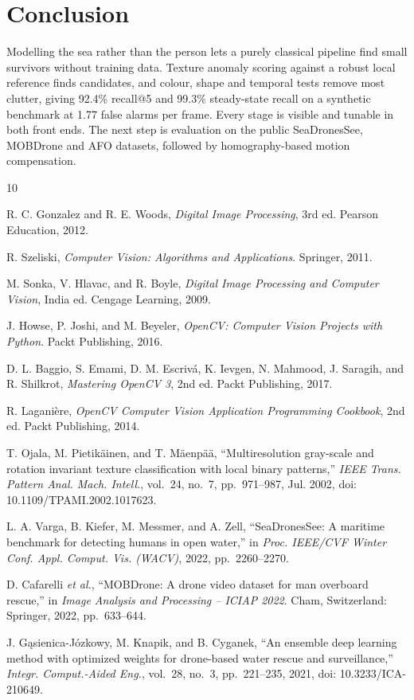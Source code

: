 \documentclass[conference,a4paper]{IEEEtran}
\begin{document}
\section{Conclusion}

Modelling the sea rather than the person lets a purely classical pipeline find small survivors without training data. Texture anomaly scoring against a robust local reference finds candidates, and colour, shape and temporal tests remove most clutter, giving 92.4\% recall@5 and 99.3\% steady-state recall on a synthetic benchmark at 1.77 false alarms per frame. Every stage is visible and tunable in both front ends. The next step is evaluation on the public SeaDronesSee, MOBDrone and AFO datasets, followed by homography-based motion compensation.

\begin{thebibliography}{10}

 R. C. Gonzalez and R. E. Woods, \emph{Digital Image Processing}, 3rd ed. Pearson Education, 2012.

 R. Szeliski, \emph{Computer Vision: Algorithms and Applications}. Springer, 2011.

 M. Sonka, V. Hlavac, and R. Boyle, \emph{Digital Image Processing and Computer Vision}, India ed. Cengage Learning, 2009.

 J. Howse, P. Joshi, and M. Beyeler, \emph{OpenCV: Computer Vision Projects with Python}. Packt Publishing, 2016.

 D. L. Baggio, S. Emami, D. M. Escriv\'a, K. Ievgen, N. Mahmood, J. Saragih, and R. Shilkrot, \emph{Mastering OpenCV 3}, 2nd ed. Packt Publishing, 2017.

 R. Lagani\`ere, \emph{OpenCV Computer Vision Application Programming Cookbook}, 2nd ed. Packt Publishing, 2014.

 T. Ojala, M. Pietik\"ainen, and T. M\"aenp\"a\"a, ``Multiresolution gray-scale and rotation invariant texture classification with local binary patterns,'' \emph{IEEE Trans. Pattern Anal. Mach. Intell.}, vol.~24, no.~7, pp.~971--987, Jul. 2002, doi: 10.1109/TPAMI.2002.1017623.

 L. A. Varga, B. Kiefer, M. Messmer, and A. Zell, ``SeaDronesSee: A maritime benchmark for detecting humans in open water,'' in \emph{Proc. IEEE/CVF Winter Conf. Appl. Comput. Vis. (WACV)}, 2022, pp.~2260--2270.

 D. Cafarelli \emph{et al.}, ``MOBDrone: A drone video dataset for man overboard rescue,'' in \emph{Image Analysis and Processing -- ICIAP 2022}. Cham, Switzerland: Springer, 2022, pp.~633--644.

 J. G\k{a}sienica-J\'ozkowy, M. Knapik, and B. Cyganek, ``An ensemble deep learning method with optimized weights for drone-based water rescue and surveillance,'' \emph{Integr. Comput.-Aided Eng.}, vol.~28, no.~3, pp.~221--235, 2021, doi: 10.3233/ICA-210649.

\end{thebibliography}
\end{document}

